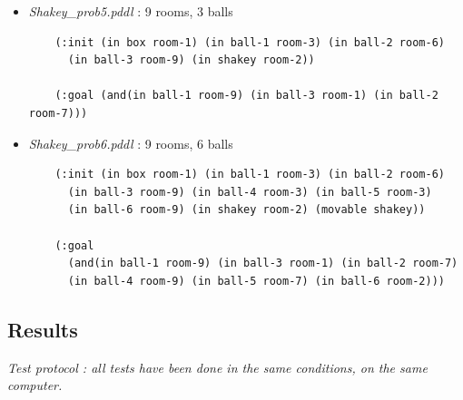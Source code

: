 \begin{itemize}
\begin{verbatim}
    (:goal (in ball-1 room-9))
  \end{verbatim}
  \item \textit{Shakey\_prob5.pddl} : 9 rooms, 3 balls
  \vspace*{1em}
  \begin{verbatim}
    (:init (in box room-1) (in ball-1 room-3) (in ball-2 room-6)
      (in ball-3 room-9) (in shakey room-2))

    (:goal (and(in ball-1 room-9) (in ball-3 room-1) (in ball-2 room-7)))
  \end{verbatim}
  \item \textit{Shakey\_prob6.pddl} : 9 rooms, 6 balls
  \vspace*{1em}
  \begin{verbatim}
    (:init (in box room-1) (in ball-1 room-3) (in ball-2 room-6)
      (in ball-3 room-9) (in ball-4 room-3) (in ball-5 room-3)
      (in ball-6 room-9) (in shakey room-2) (movable shakey))

    (:goal
      (and(in ball-1 room-9) (in ball-3 room-1) (in ball-2 room-7)
      (in ball-4 room-9) (in ball-5 room-7) (in ball-6 room-2)))
  \end{verbatim}
\end{itemize}
\subsection*{Results}

\textit{Test protocol : all tests have been done in the same conditions, on
the same computer.}
